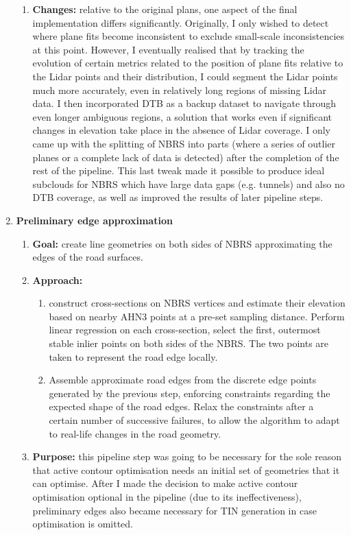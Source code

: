 \begin{enumerate}
\begin{enumerate}
        \item \textbf{Changes:} relative to the original plans, one aspect of the final implementation differs significantly. Originally, I only wished to detect where plane fits become inconsistent to exclude small-scale inconsistencies at this point. However, I eventually realised that by tracking the evolution of certain metrics related to the position of plane fits relative to the Lidar points and their distribution, I could segment the Lidar points much more accurately, even in relatively long regions of missing Lidar data. I then incorporated DTB as a backup dataset to navigate through even longer ambiguous regions, a solution that works even if significant changes in elevation take place in the absence of Lidar coverage. I only came up with the splitting of NBRS into parts (where a series of outlier planes or a complete lack of data is detected) after the completion of the rest of the pipeline. This last tweak made it possible to produce ideal subclouds for NBRS which have large data gaps (e.g. tunnels) and also no DTB coverage, as well as improved the results of later pipeline steps.
    \end{enumerate}
    \item \textbf{Preliminary edge approximation}
    \begin{enumerate}
        \item \textbf{Goal:} create line geometries on both sides of NBRS approximating the edges of the road surfaces.
        \item \textbf{Approach:}
        \begin{enumerate}
            \item construct cross-sections on NBRS vertices and estimate their elevation based on nearby AHN3 points at a pre-set sampling distance. Perform linear regression on each cross-section, select the first, outermost stable inlier points on both sides of the NBRS. The two points are taken to represent the road edge locally.
            \item Assemble approximate road edges from the discrete edge points generated by the previous step, enforcing constraints regarding the expected shape of the road edges. Relax the constraints after a certain number of successive failures, to allow the algorithm to adapt to real-life changes in the road geometry.
        \end{enumerate}
        \item \textbf{Purpose:} this pipeline step was going to be necessary for the sole reason that active contour optimisation needs an initial set of geometries that it can optimise. After I made the decision to make active contour optimisation optional in the pipeline (due to its ineffectiveness), preliminary edges also became necessary for TIN generation in case optimisation is omitted.

\end{enumerate}
\end{enumerate}
